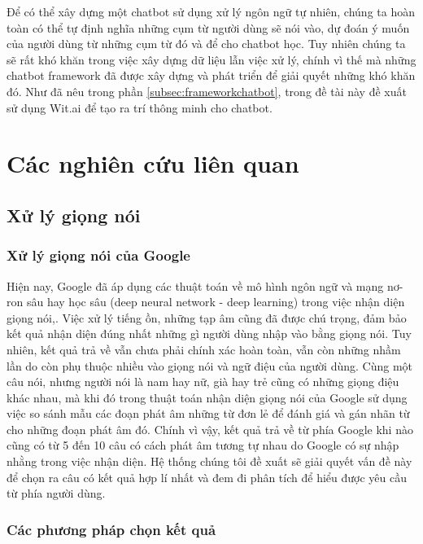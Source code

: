 \documentclass[12pt]{report}
\begin{document}
Để có thể xây dựng một chatbot sử dụng xử lý ngôn ngữ tự nhiên, chúng ta hoàn toàn có thể tự định nghĩa những cụm từ người dùng sẽ nói vào, dự đoán ý muốn của người dùng từ những cụm từ đó và để cho chatbot học. Tuy nhiên chúng ta sẽ rất khó khăn trong việc xây dựng dữ liệu lẫn việc xử lý, chính vì thế mà những chatbot framework đã được xây dựng và phát triển để giải quyết những khó khăn đó. Như đã nêu trong phần \ref{subsec:frameworkchatbot}, trong đề tài này đề xuất sử dụng Wit.ai để tạo ra trí thông minh cho chatbot.

\chapter{Các nghiên cứu liên quan}

\section{Xử lý giọng nói}

\subsection{Xử lý giọng nói của Google}

Hiện nay, Google đã áp dụng các thuật toán về mô hình ngôn ngữ và mạng nơ-ron sâu hay học sâu (deep neural network - deep learning) trong việc nhận diện giọng nói\cite{robustasr},\cite{bayesLMformobile}. Việc xử lý tiếng ồn, những tạp âm cũng đã được chú trọng, đảm bảo kết quả nhận diện đúng nhất những gì người dùng nhập vào bằng giọng nói\cite{robustasr}. Tuy nhiên, kết quả trả về vẫn chưa phải chính xác hoàn toàn, vẫn còn những nhầm lần do còn phụ thuộc nhiều vào giọng nói và ngữ điệu của người dùng. Cùng một câu nói, nhưng người nói là nam hay nữ, già hay trẻ cũng có những giọng điệu khác nhau, mà khi đó trong thuật toán nhận diện giọng nói của Google sử dụng việc so sánh mẫu các đoạn phát âm những từ đơn lẻ để đánh giá và gán nhãn từ cho những đoạn phát âm đó. Chính vì vậy, kết quả trả về từ phía Google khi nào cũng có từ 5 đến 10 câu có cách phát âm tương tự nhau do Google có sự nhập nhằng trong việc nhận diện. Hệ thống chúng tôi đề xuất sẽ giải quyết vấn đề này để chọn ra câu có kết quả hợp lí nhất và đem đi phân tích để hiểu được yêu cầu từ phía người dùng.

\subsection{Các phương pháp chọn kết quả}
\end{document}
